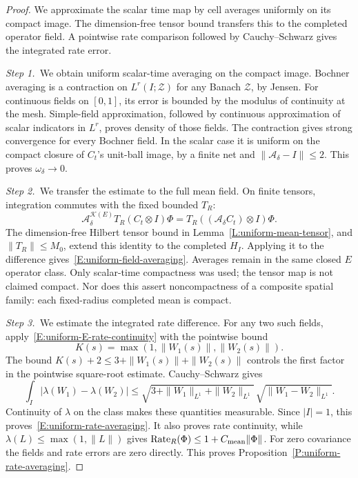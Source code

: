 \begin{proof}
  We approximate the scalar time map by cell averages uniformly on its compact
  image. The dimension-free tensor bound transfers this to the completed
  operator field. A pointwise rate comparison followed by Cauchy--Schwarz
  gives the integrated rate error.


  \medskip
  \noindent\textit{Step 1.~}We obtain uniform scalar-time averaging on the
  compact image.
  Bochner averaging is a contraction on $L^r(I;\mathscr{Z})$ for any Banach
  $\mathscr{Z}$, by Jensen. For continuous fields on $[0,1]$, its error is
  bounded by the modulus of continuity at the mesh. Simple-field approximation,
  followed by continuous approximation of scalar indicators in $L^r$, proves
  density of those fields. The contraction gives strong convergence for every
  Bochner field. In the scalar case it is uniform on the compact closure of
  $C_t$'s unit-ball image, by a finite net and $\|\mathcal{A}_\delta-I\| \le 2$.
  This proves $\omega_\delta \to 0$.


  \medskip
  \noindent\textit{Step 2.~}We transfer the estimate to the full mean field.
  On finite tensors, integration commutes with the fixed bounded $T_R$:
  \[
    \mathcal{A}_\delta^{\mathcal{K}(E)}
    T_R(C_t\otimes I)\Phi
    =T_R((\mathcal{A}_\delta C_t)\otimes I)\Phi .
  \]
  The dimension-free Hilbert tensor bound in Lemma~\ref{L:uniform-mean-tensor},
  and $\|T_R\| \le M_0$, extend this identity to the completed $H_I$. Applying
  it to the difference gives~\eqref{E:uniform-field-averaging}. Averages remain
  in the same closed $E$ operator class. Only scalar-time compactness was used;
  the tensor map is not claimed compact. Nor does this assert noncompactness of
  a composite spatial family: each fixed-radius completed mean is compact.


  \medskip
  \noindent\textit{Step 3.~}We estimate the integrated rate difference.
  For any two such fields, apply~\eqref{E:uniform-E-rate-continuity} with the
  pointwise bound
  \[
    K(s)=\max(1,\|W_1(s)\|,\|W_2(s)\|).
  \]
  The bound $K(s)+2\le3+\|W_1(s)\|+\|W_2(s)\|$ controls the first factor in
  the pointwise square-root estimate.
  Cauchy--Schwarz gives
  \[
    \int_I|\lambda(W_1)-\lambda(W_2)|
    \le\sqrt{3+\|W_1\|_{L^1}+\|W_2\|_{L^1}}\,
    \sqrt{\|W_1-W_2\|_{L^1}} .
  \]
  Continuity of $\lambda$ on the class makes these quantities measurable. Since
  $|I| = 1$, this proves~\eqref{E:uniform-rate-averaging}. It also proves rate
  continuity, while $\lambda(L) \le \max(1,\|L\|)$ gives
  $\operatorname{Rate}_R(\Phi) \le 1+C_{\rm mean}\|\Phi\|$. For zero covariance
  the fields and rate errors are zero directly. This proves
  Proposition~\ref{P:uniform-rate-averaging}.
\end{proof}

